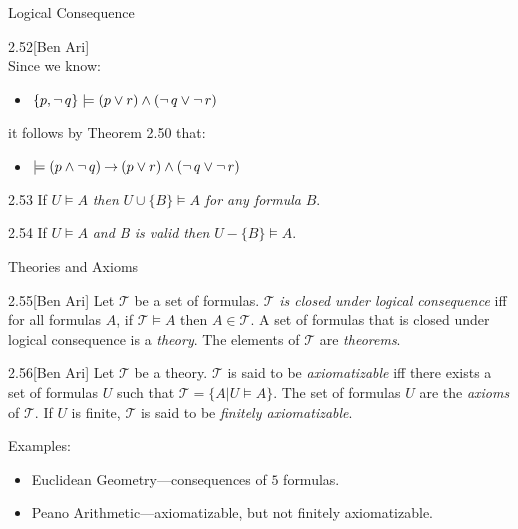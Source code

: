 \documentclass[style=sailor,size=12pt]{powerdot}
\begin{document}
\begin{wideslide}[bm=,toc=]{Logical Consequence}
\begin{ex}{2.52}[Ben Ari]
~\\Since we know:
\begin{itemize}
\item $\{p,\mathop{\neg} q\} \models (p \lor r) \land (\mathop{\neg} q \lor \mathop{\neg} r)$
\end{itemize}
it follows by Theorem 2.50 that:
\begin{itemize}
\item $\models (p \land \mathop{\neg} q) \mathbin{\rightarrow} (p \lor r) \land (\mathop{\neg} q \lor \mathop{\neg} r)$
\end{itemize}
\end{ex}
\begin{thm}{2.53}
If $U \models A$ \emph{then} $U \cup \{B\} \models A$ \emph{for any formula} $B$. 
\end{thm}
\begin{thm}{2.54}
If $U \models A$ \emph{ and B is valid then} $U - \{B\} \models A$. 
\end{thm}

\end{wideslide}

\begin{wideslide}[bm=,toc=]{Theories and Axioms}
\begin{defn}{2.55}[Ben Ari]
Let $\mathcal{T}$ be a set of formulas. $\mathcal{T}$ \emph{is closed under
logical consequence} iff for all formulas $A$, if $\mathcal{T} \models A$ then
$A \in \mathcal{T}$. A set of formulas that is closed under logical consequence
is a \emph{theory}. The elements of $\mathcal{T}$ are \emph{theorems}.
\end{defn}
\begin{defn}{2.56}[Ben Ari]
Let $\mathcal{T}$ be a theory. $\mathcal{T}$ is said to be \emph{axiomatizable} 
iff there exists a set of formulas $U$ such that  $\mathcal{T} = \{A | U \models
A\}$. The set of formulas $U$ are the \emph{axioms} of $\mathcal{T}$. If $U$ is
finite, $\mathcal{T}$ is said to be \emph{finitely axiomatizable}.
\end{defn}
Examples:
\begin{itemize}
\item Euclidean Geometry---consequences of $5$ formulas.
\item Peano Arithmetic---axiomatizable, but not finitely axiomatizable.
\end{itemize}


\end{wideslide}
\end{document}
